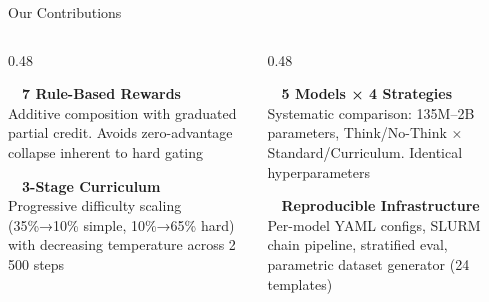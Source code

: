\documentclass[10pt, aspectratio=169]{beamer}
\begin{document}
\begin{frame}{Our Contributions}
  \vspace{0.2em}
  \begin{columns}[T]
    \begin{column}{0.48\textwidth}
      \begin{tcolorbox}[insightbox=sky]
        \textcolor{sky}{\faPuzzlePiece}~~\textbf{7 Rule-Based Rewards}\\[3pt]
        \scriptsize Additive composition with graduated partial credit. Avoids zero-advantage collapse inherent to hard gating
      \end{tcolorbox}
      \vspace{0.4em}
      \begin{tcolorbox}[insightbox=accent]
        \textcolor{accent}{\faLayerGroup}~~\textbf{3-Stage Curriculum}\\[3pt]
        \scriptsize Progressive difficulty scaling (35\%→10\% simple, 10\%→65\% hard) with decreasing temperature across 2\,500 steps
      \end{tcolorbox}
    \end{column}
    \begin{column}{0.48\textwidth}
      \begin{tcolorbox}[insightbox=gold]
        \textcolor{gold}{\faBalanceScale}~~\textbf{5 Models × 4 Strategies}\\[3pt]
        \scriptsize Systematic comparison: 135M–2B parameters, Think/No-Think × Standard/Curriculum. Identical hyperparameters
      \end{tcolorbox}
      \vspace{0.4em}
      \begin{tcolorbox}[insightbox=navy]
        \textcolor{navy}{\faServer}~~\textbf{Reproducible Infrastructure}\\[3pt]
        \scriptsize Per-model YAML configs, SLURM chain pipeline, stratified eval, parametric dataset generator (24 templates)
      \end{tcolorbox}
    \end{column}
  \end{columns}
\end{frame}
\end{document}
